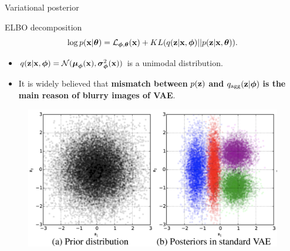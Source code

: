 \begin{frame}{Variational posterior}
	\begin{block}{ELBO decomposition}
		\vspace{-0.3cm}
		\[
			\log p(\mathbf{x} | \boldsymbol{\theta}) =\mathcal{L}_{\boldsymbol{\phi}, \boldsymbol{\theta}}(\mathbf{x}) + KL(q(\mathbf{z} | \mathbf{x}, \boldsymbol{\phi}) || p(\mathbf{z} | \mathbf{x}, \boldsymbol{\theta})).
		\]
		\vspace{-0.5cm}
	\end{block}
	\begin{itemize}
		\item $q(\mathbf{z} | \mathbf{x}, \boldsymbol{\phi}) = \mathcal{N}(\boldsymbol{\mu}_{\boldsymbol{\phi}}(\mathbf{x}), \boldsymbol{\sigma}^2_{\boldsymbol{\phi}}(\mathbf{x}))$ is a unimodal distribution. 
		\item It is widely believed that \textbf{mismatch between} $p(\mathbf{z})$  \textbf{and} $q_{\text{agg}}(\mathbf{z} | \boldsymbol{\phi})$  \textbf{is the main reason of blurry images of VAE}.
	\end{itemize}
	\begin{figure}
		\includegraphics[width=0.8\linewidth]{figs/agg_posterior}
	\end{figure}
\end{frame}
